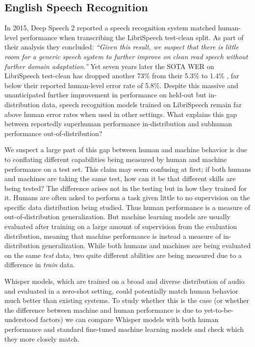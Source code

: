 \documentclass[nohyperref]{article}
\theoremstyle{plain}
\theoremstyle{definition}
\theoremstyle{remark}
\begin{document}
\subsection{English Speech Recognition}\label{subsec:zero-shot}

In 2015, Deep Speech 2 \cite{amodei2015deepspeech2} reported a speech recognition system matched human-level performance when transcribing the LibriSpeech test-clean split. As part of their analysis they concluded: \textit{``Given this result, we suspect that there is little room for a generic speech system to further improve on clean read speech without further domain adaptation.''} Yet seven years later the SOTA WER on LibriSpeech test-clean has dropped another 73\% from their 5.3\% to 1.4\% \cite{zhang2021bigssl}, far below their reported human-level error rate of 5.8\%. Despite this massive and unanticipated further improvement in performance on held-out but in-distribution data, speech recognition models trained on LibriSpeech remain far above human error rates when used in other settings.
What explains this gap between reportedly superhuman performance in-distribution and subhuman performance out-of-distribution?

We suspect a large part of this gap between human and machine behavior is due to conflating different capabilities being measured by human and machine performance on a test set. This claim may seem confusing at first; if both humans and machines are taking the same test, how can it be that different skills are being tested? The difference arises not in the testing but in how they trained for it. Humans are often asked to perform a task given little to no supervision on the specific data distribution being studied. Thus human performance is a measure of out-of-distribution generalization. But machine learning models are usually evaluated after training on a large amount of supervision from the evaluation distribution, meaning that machine performance is instead a measure of in-distribution generalization. While both humans and machines are being evaluated on the same \textit{test} data, two quite different abilities are being measured due to a difference in \textit{train} data.

Whisper models, which are trained on a broad and diverse distribution of audio and evaluated in a zero-shot setting, could potentially match human behavior much better than existing systems. To study whether this is the case (or whether the difference between machine and human performance is due to yet-to-be-understood factors) we can compare Whisper models with both human performance and standard fine-tuned machine learning models and check which they more closely match.
\end{document}

